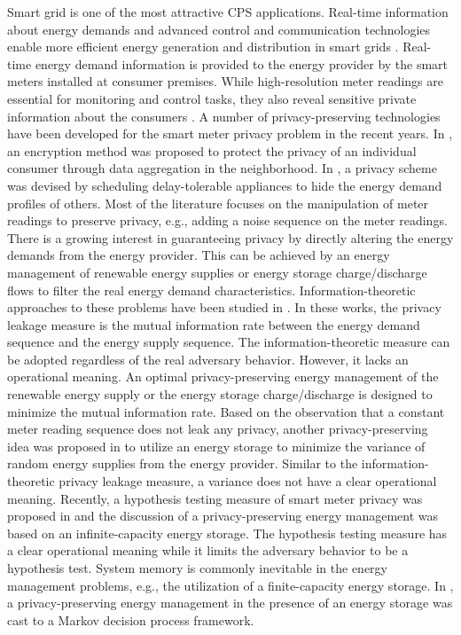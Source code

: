 \documentclass[g5paper,phd,electronic]{kthesis}
\numberwithin{theorem}{chapter}
\numberwithin{lemma}{chapter}
\numberwithin{proposition}{chapter}
\numberwithin{corollary}{chapter}
\numberwithin{remark}{chapter}
\numberwithin{property}{chapter}
\numberwithin{conjecture}{chapter}
\numberwithin{assumption}{chapter}
\numberwithin{algorithm}{chapter}
\begin{document}
Smart grid is one of the most attractive CPS applications. Real-time information about energy demands and advanced control and communication technologies enable more efficient energy generation and distribution in smart grids \cite{tan2013}. Real-time energy demand information is provided to the energy provider by the smart meters installed at consumer premises. While high-resolution meter readings are essential for monitoring and control tasks, they also reveal sensitive private information about the consumers \cite{sultanem1991,andres2010}. A number of privacy-preserving technologies have been developed for the smart meter privacy problem in the recent years. In \cite{fenjun2010}, an encryption method was proposed to protect the privacy of an individual consumer through data aggregation in the neighborhood. In \cite{kalogridis2010}, a privacy scheme was devised by scheduling delay-tolerable appliances to hide the energy demand profiles of others. Most of the literature focuses on the manipulation of meter readings to preserve privacy, e.g., adding a noise sequence on the meter readings. There is a growing interest in guaranteeing privacy by directly altering the energy demands from the energy provider. This can be achieved by an energy management of renewable energy supplies or energy storage charge/discharge flows to filter the real energy demand characteristics. Information-theoretic approaches to these problems have been studied in \cite{tan2013,varodayan2011,gunduz2013,giulio2015}. In these works, the privacy leakage measure is the mutual information rate between the energy demand sequence and the energy supply sequence. The information-theoretic measure can be adopted regardless of the real adversary behavior. However, it lacks an operational meaning. An optimal privacy-preserving energy management of the renewable energy supply or the energy storage charge/discharge is designed to minimize the mutual information rate. Based on the observation that a constant meter reading sequence does not leak any privacy, another privacy-preserving idea was proposed in \cite{lei2014} to utilize an energy storage to minimize the variance of random energy supplies from the energy provider. Similar to the information-theoretic privacy leakage measure, a variance does not have a clear operational meaning. Recently, a hypothesis testing measure of smart meter privacy was proposed in \cite{zuxing20152} and the discussion of a privacy-preserving energy management was based on an infinite-capacity energy storage. The hypothesis testing measure has a clear operational meaning while it limits the adversary behavior to be a hypothesis test. System memory is commonly inevitable in the energy management problems, e.g., the utilization of a finite-capacity energy storage. In \cite{jiyun2013,jiyun2014,simon2015}, a privacy-preserving energy management in the presence of an energy storage was cast to a Markov decision process framework.
\end{document}
